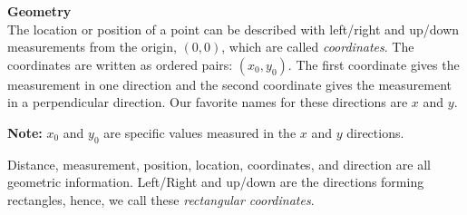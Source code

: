 \documentclass{ximera}
\begin{document}
\textbf{\textcolor{purple!85!blue}{Geometry}} \\

The location or position of a point can be described with left/right and up/down measurements from the origin, $(0,0)$, which are called \textit{coordinates}.  The coordinates are written as ordered pairs: $(x_0, y_0)$. The first coordinate gives the measurement in one direction and the second coordinate gives the measurement in a perpendicular direction.  Our favorite names for these directions are $x$ and $y$. 

\textbf{Note:} $x_0$ and $y_0$ are specific values measured in the $x$ and $y$ directions. 


Distance, measurement, position, location, coordinates, and direction are all geometric information.  Left/Right and up/down are the directions forming rectangles, hence, we call these \textit{rectangular coordinates}.













\begin{image}
\end{image}
\end{document}
